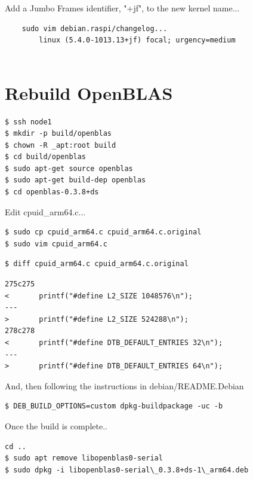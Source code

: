 \documentclass{report}
\begin{document}
Add a Jumbo Frames identifier, "+jf", to the new kernel name...

\begin{verbatim}
    sudo vim debian.raspi/changelog...
        linux (5.4.0-1013.13+jf) focal; urgency=medium
        
\end{verbatim}


%
%
\chapter{Rebuild OpenBLAS}

\lstset{style=termstyle}
\begin{lstlisting}
$ ssh node1
$ mkdir -p build/openblas
$ chown -R _apt:root build
$ cd build/openblas
$ sudo apt-get source openblas
$ sudo apt-get build-dep openblas
$ cd openblas-0.3.8+ds
\end{lstlisting}


Edit cpuid\_arm64.c...

\lstset{style=termstyle}
\begin{lstlisting}
$ sudo cp cpuid_arm64.c cpuid_arm64.c.original
$ sudo vim cpuid_arm64.c
\end{lstlisting}


\lstset{style=termstyle}
\begin{lstlisting}
$ diff cpuid_arm64.c cpuid_arm64.c.original
\end{lstlisting}

\lstset{style=termstyle}
\begin{lstlisting}
275c275
<       printf("#define L2_SIZE 1048576\n");
---
>       printf("#define L2_SIZE 524288\n");
278c278
<       printf("#define DTB_DEFAULT_ENTRIES 32\n");
---
>       printf("#define DTB_DEFAULT_ENTRIES 64\n");
\end{lstlisting}


And, then following the instructions in debian/README.Debian

\lstset{style=termstyle}
\begin{lstlisting}
$ DEB_BUILD_OPTIONS=custom dpkg-buildpackage -uc -b
\end{lstlisting}

Once the build is complete..

\lstset{style=termstyle}
\begin{lstlisting}
cd ..
$ sudo apt remove libopenblas0-serial
$ sudo dpkg -i libopenblas0-serial\_0.3.8+ds-1\_arm64.deb
\end{lstlisting}
\end{document}
